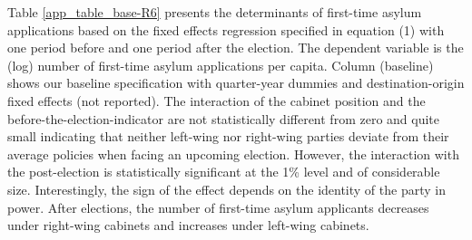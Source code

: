 \documentclass[a4paper,12pt]{article}
\begin{document}
Table \ref{app_table_base-R6} presents the determinants of first-time asylum applications based on the fixed effects regression specified in equation (1) with one period before and one period after the election.
 The dependent variable is the (log) number of first-time asylum applications per capita. 
 Column (baseline)
 shows our baseline specification with quarter-year dummies and destination-origin fixed effects (not reported). 
  The interaction of the cabinet position and the before-the-election-indicator are not statistically different from zero and quite small indicating that neither left-wing nor right-wing parties deviate from their average policies when facing an upcoming election. However, the interaction with the post-election is statistically significant at the 1\% level and of considerable size. Interestingly, the sign of the effect depends on the identity of the party in power. After elections, the number of first-time asylum applicants decreases under right-wing cabinets and increases under left-wing cabinets. 
\end{document}
